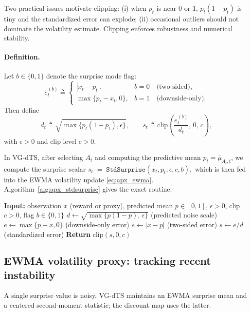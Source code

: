 Two practical issues motivate clipping:
(i) when $p_t$ is near $0$ or $1$, $p_t(1-p_t)$ is tiny and the standardized error can explode;
(ii) occasional outliers should not dominate the volatility estimate.
Clipping enforces robustness and numerical stability.

\paragraph{Definition.}
Let $b\in\{0,1\}$ denote the surprise mode flag:
\[
e_t^{(b)} \triangleq
\begin{cases}
|x_t-p_t|, & b=0 \quad \text{(two-sided)},\\
\max\{p_t-x_t,0\}, & b=1 \quad \text{(downside-only)}.
\end{cases}
\]
Then define
\begin{equation}
d_t \triangleq \sqrt{\max\{p_t(1-p_t),\epsilon\}},\qquad
s_t \triangleq \mathrm{clip}\!\left(\frac{e_t^{(b)}}{d_t},\,0,\,c\right),
\label{eq:apx_surprise}
\end{equation}
with $\epsilon>0$ and clip level $c>0$.

In VG-dTS, after selecting $A_t$ and computing the predictive mean $p_t=\bar{\mu}_{A_t,t}$, we compute the surprise scalar
$
s_t \;=\; \texttt{StdSurprise}(x_t,p_t;\epsilon,c,b),
$
which is then fed into the EWMA volatility update \eqref{eq:apx_ewma}. Algorithm~\ref{alg:apx_stdsurprise} gives the exact routine.

\begin{algorithm}[t]
\caption{\texttt{StdSurprise}$(x,p;\epsilon,c,b)$: standardized and clipped prediction error}
\label{alg:apx_stdsurprise}
\begin{algorithmic}[1]
\STATE \textbf{Input:} observation $x$ (reward or proxy), predicted mean $p\in[0,1]$, $\epsilon>0$, clip $c>0$, flag $b\in\{0,1\}$
\STATE $d \leftarrow \sqrt{\max\{p(1-p),\,\epsilon\}}$ \hfill (predicted noise scale)
    \STATE $e \leftarrow \max\{p-x,0\}$ \hfill (downside-only error)
\ELSE
    \STATE $e \leftarrow |x-p|$ \hfill (two-sided error)
\ENDIF
\STATE $s \leftarrow e/d$ \hfill (standardized error)
\STATE \textbf{Return} $\mathrm{clip}(s,0,c)$
\end{algorithmic}
\end{algorithm}

\subsection{EWMA volatility proxy: tracking recent instability}
A single surprise value is noisy. VG-dTS maintains an EWMA surprise mean and a centered second-moment statistic; the discount map uses the latter.

